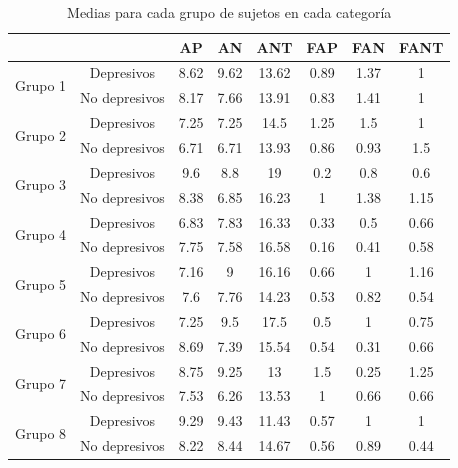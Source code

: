 \documentclass[a4paper,11pt]{article}
\begin{document}
\begin{table}[h!]
\centering
\begin{tabular}{|c|c|c|c|c|c|c|c|}
\hline
                         &    & AP   & AN   & ANT   & FAP  & FAN  & FANT \\ \hline
\multirow{2}{*}{Grupo 1} & Depresivos  & 8.62 & 9.62 & 13.62 & 0.89 & 1.37 & 1    \\ \cline{2-8} 
                         & No depresivos & 8.17 & 7.66 & 13.91 & 0.83 & 1.41 & 1    \\ \hline
\multirow{2}{*}{Grupo 2} & Depresivos  & 7.25 & 7.25 & 14.5  & 1.25 & 1.5  & 1    \\ \cline{2-8} 
                         & No depresivos & 6.71 & 6.71 & 13.93 & 0.86 & 0.93 & 1.5  \\ \hline
\multirow{2}{*}{Grupo 3} & Depresivos  & 9.6  & 8.8  & 19    & 0.2  & 0.8  & 0.6  \\ \cline{2-8} 
                         & No depresivos & 8.38 & 6.85 & 16.23 & 1    & 1.38 & 1.15 \\ \hline
\multirow{2}{*}{Grupo 4} & Depresivos  & 6.83 & 7.83 & 16.33 & 0.33 & 0.5  & 0.66 \\ \cline{2-8} 
                         & No depresivos & 7.75 & 7.58 & 16.58 & 0.16 & 0.41 & 0.58 \\ \hline
\multirow{2}{*}{Grupo 5} & Depresivos  & 7.16 & 9    & 16.16 & 0.66 & 1    & 1.16 \\ \cline{2-8} 
                         & No depresivos & 7.6  & 7.76 & 14.23 & 0.53 & 0.82 & 0.54 \\ \hline
\multirow{2}{*}{Grupo 6} & Depresivos  & 7.25 & 9.5  & 17.5  & 0.5  & 1    & 0.75 \\ \cline{2-8} 
                         & No depresivos & 8.69 & 7.39 & 15.54 & 0.54 & 0.31 & 0.66 \\ \hline
\multirow{2}{*}{Grupo 7} & Depresivos  & 8.75 & 9.25 & 13    & 1.5  & 0.25 & 1.25 \\ \cline{2-8} 
                         & No depresivos & 7.53 & 6.26 & 13.53 & 1    & 0.66 & 0.66 \\ \hline
\multirow{2}{*}{Grupo 8} & Depresivos  & 9.29 & 9.43 & 11.43 & 0.57 & 1    & 1    \\ \cline{2-8} 
                         & No depresivos & 8.22 & 8.44 & 14.67 & 0.56 & 0.89 & 0.44 \\ \hline
\end{tabular}
\caption{Medias para cada grupo de sujetos en cada categoría}
\end{table}
\end{document}
